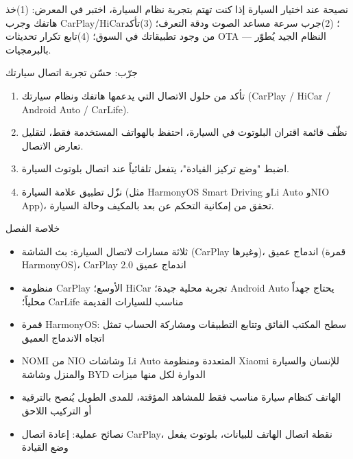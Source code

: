 \begin{tcbinfo}{نصيحة عند اختيار السيارة}
إذا كنت تهتم بتجربة نظام السيارة، اختبر في المعرض: (1)خذ هاتفك وجرب CarPlay/HiCar؛ (2)جرب سرعة مساعد الصوت ودقة التعرف؛ (3)تأكد من وجود تطبيقاتك في السوق؛ (4)تابع تكرار تحديثات OTA — النظام الجيد يُطوّر بالبرمجيات.

\end{tcbinfo}

\begin{tcbpractice}{جرّب: حسّن تجربة اتصال سيارتك}
\begin{enumerate}
  \item تأكد من حلول الاتصال التي يدعمها هاتفك ونظام سيارتك (CarPlay / HiCar / Android Auto / CarLife).
  \item نظّف قائمة اقتران البلوتوث في السيارة، احتفظ بالهواتف المستخدمة فقط، لتقليل تعارض الاتصال.
  \item اضبط "وضع تركيز القيادة"، يتفعل تلقائياً عند اتصال بلوتوث السيارة.
  \item نزّل تطبيق علامة السيارة (مثل HarmonyOS Smart Driving وLi Auto وNIO App)، تحقق من إمكانية التحكم عن بعد بالمكيف وحالة السيارة.
\end{enumerate}

\end{tcbpractice}

\begin{tcbsummary}{خلاصة الفصل}
\begin{itemize}
  \item ثلاثة مسارات لاتصال السيارة: بث الشاشة (CarPlay وغيرها)، اندماج عميق (قمرة HarmonyOS)، CarPlay 2.0 اندماج عميق
  \item منظومة CarPlay الأوسع؛ HiCar تجربة محلية جيدة؛ Android Auto يحتاج جهداً محلياً؛ CarLife مناسب للسيارات القديمة
  \item قمرة HarmonyOS: سطح المكتب الفائق وتتابع التطبيقات ومشاركة الحساب تمثل اتجاه الاندماج العميق
  \item NOMI من NIO وشاشات Li Auto المتعددة ومنظومة Xiaomi للإنسان والسيارة والمنزل وشاشة BYD الدوارة لكل منها ميزات
  \item الهاتف كنظام سيارة مناسب فقط للمشاهد المؤقتة، للمدى الطويل يُنصح بالترقية أو التركيب اللاحق
  \item نصائح عملية: إعادة اتصال CarPlay، نقطة اتصال الهاتف للبيانات، بلوتوث يفعل وضع القيادة
\end{itemize}

\end{tcbsummary}
